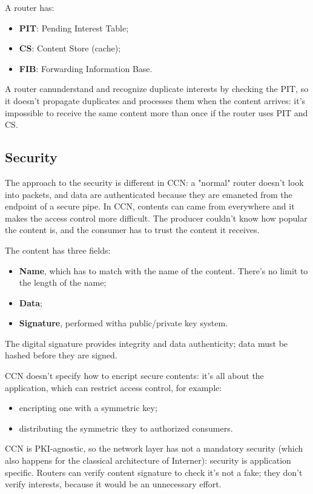 A router has:
\begin{itemize}
  \item \textbf{PIT}: Pending Interest Table;
  \item \textbf{CS}: Content Store (cache);
  \item \textbf{FIB}: Forwarding Information Base.
\end{itemize}

A router canunderstand and recognize duplicate interests by checking the PIT,
so it doesn't propagate duplicates and processes them when the content arrives:
it's impossible to receive the same content more than once if the router uses
PIT and CS.

\subsection{Security}
The approach to the security is different in CCN: a "normal" router doesn't
look into packets, and data are authenticated because they are emaneted from
the endpoint of a secure pipe. In CCN, contents can came from everywhere and it
makes the access control more difficult. The producer couldn't know how popular
the content is, and the consumer has to trust the content it receives.

The content has three fields:
\begin{itemize}
  \item \textbf{Name}, which has to match with the name of the content. There's
no limit to the length of the name;
  \item \textbf{Data};
  \item \textbf{Signature}, performed witha  public/private key system.
\end{itemize}
The digital signature provides integrity and data authenticity; data must be
hashed before they are signed.

CCN doesn't specify how to encript secure contents: it's all about the
application, which can restrict access control, for example:
\begin{itemize}
  \item encripting one with a symmetric key;
  \item distributing the symmetric tkey to authorized consumers.
\end{itemize}
CCN is PKI-agnostic, so the network layer has not a mandatory security (which
also happens for the classical architecture of Interner): security is
application specific. Routers can verify content signature to check it's not a
fake; they don't verify interests, because it would be an unnecessary effort.

